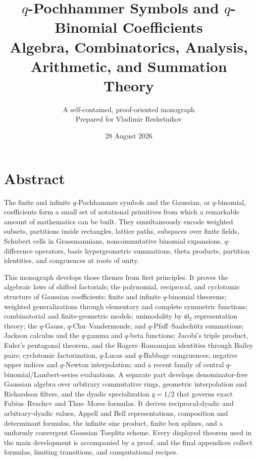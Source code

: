 \documentclass[11pt,oneside,openany]{book}
\title{\Huge\bfseries $q$-Pochhammer Symbols and $q$-Binomial Coefficients\\[8pt]
\Large Algebra, Combinatorics, Analysis, Arithmetic, and Summation Theory}
\author{A self-contained, proof-oriented monograph\\[4pt]\large Prepared for Vladimir Reshetnikov}
\date{28 August 2026}
\theoremstyle{definition}
\theoremstyle{remark}
\begin{document}
\frontmatter
\hypersetup{pageanchor=false}
\maketitle
\hypersetup{pageanchor=true}

\chapter*{Abstract}
The finite and infinite $q$-Pochhammer symbols and the Gaussian, or $q$-binomial, coefficients form a small set of notational primitives from which a remarkable amount of mathematics can be built.  They simultaneously encode weighted subsets, partitions inside rectangles, lattice paths, subspaces over finite fields, Schubert cells in Grassmannians, noncommutative binomial expansions, $q$-difference operators, basic hypergeometric summations, theta products, partition identities, and congruences at roots of unity.

This monograph develops those themes from first principles.  It proves the algebraic laws of shifted factorials; the polynomial, reciprocal, and cyclotomic structure of Gaussian coefficients; finite and infinite $q$-binomial theorems; weighted generalizations through elementary and complete symmetric functions; combinatorial and finite-geometric models; unimodality by $\mathfrak{sl}_2$ representation theory; the $q$-Gauss, $q$-Chu--Vandermonde, and $q$-Pfaff--Saalsch\"utz summations; Jackson calculus and the $q$-gamma and $q$-beta functions; Jacobi's triple product, Euler's pentagonal theorem, and the Rogers--Ramanujan identities through Bailey pairs; cyclotomic factorization, $q$-Lucas and $q$-Babbage congruences; negative upper indices and $q$-Newton interpolation; and a recent family of central $q$-binomial/Lambert-series evaluations.  A separate part develops denominator-free Gaussian algebra over arbitrary commutative rings, geometric interpolation and Richardson filters, and the dyadic specialization $q=1/2$ that governs exact Fabius--Rvachev and Thue--Morse formulas.  It derives reciprocal-dyadic and arbitrary-dyadic values, Appell and Bell representations, composition and determinant formulas, the infinite sinc product, finite box splines, and a uniformly convergent Gaussian Toeplitz scheme.  Every displayed theorem used in the main development is accompanied by a proof, and the final appendices collect formulas, limiting transitions, and computational recipes.
\end{document}
